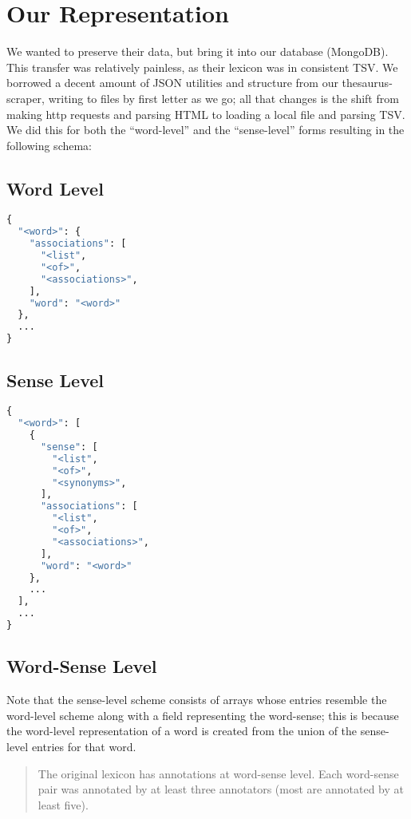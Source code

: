 \documentclass[11pt, twoside, reqno]{book}
\begin{document}
\section{Our Representation}

We wanted to preserve their data, but bring it into our database (MongoDB). This transfer was relatively painless, as their lexicon was in consistent TSV. We borrowed a decent amount of JSON utilities and structure from our thesaurus-scraper, writing to files by first letter as we go; all that changes is the shift from making http requests and parsing HTML to loading a local file and parsing TSV. We did this for both the ``word-level'' and the ``sense-level'' forms resulting in the following schema:

\subsection{Word Level}
\begin{lstlisting}[language=Python]
{
  "<word>": {
    "associations": [
      "<list",
      "<of>",
      "<associations>",
    ],
    "word": "<word>"
  },
  ...
}
\end{lstlisting}

\subsection{Sense Level}
\begin{lstlisting}[language=Python]
{
  "<word>": [
    {
      "sense": [
        "<list",
        "<of>",
        "<synonyms>",
      ],
      "associations": [
        "<list",
        "<of>",
        "<associations>",
      ],
      "word": "<word>"
    },
    ...
  ],
  ...
}
\end{lstlisting}

\subsection{Word-Sense Level}

Note that the sense-level scheme consists of arrays whose entries resemble the word-level scheme along with a field representing the word-sense; this is because the word-level representation of a word is created from the union of the sense-level entries for that word.

\begin{quote}
The original lexicon has annotations at word-sense level. Each word-sense pair was annotated by at least three annotators (most are annotated by at least five).
\end{quote}
\end{document}

